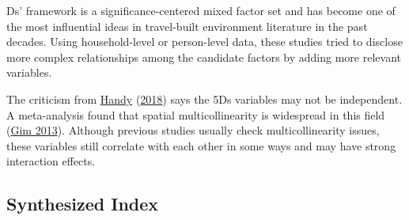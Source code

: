 \documentclass[
  11pt,
  openany]{memoir}
\begin{document}
Ds' framework is a significance-centered mixed factor set and has become one of the most influential ideas in travel-built environment literature in the past decades. Using household-level or person-level data, these studies tried to disclose more complex relationships among the candidate factors by adding more relevant variables.

The criticism from \protect\hyperlink{ref-handyEnoughAlreadyLet2018}{Handy} (\protect\hyperlink{ref-handyEnoughAlreadyLet2018}{2018}) says the 5Ds variables may not be independent. A meta-analysis found that spatial multicollinearity is widespread in this field (\protect\hyperlink{ref-gimRelationshipsLandUse2013}{Gim 2013}). Although previous studies usually check multicollinearity issues, these variables still correlate with each other in some ways and may have strong interaction effects.

\hypertarget{synthesized-index}{%
\subsection{Synthesized Index}\label{synthesized-index}}
\end{document}
